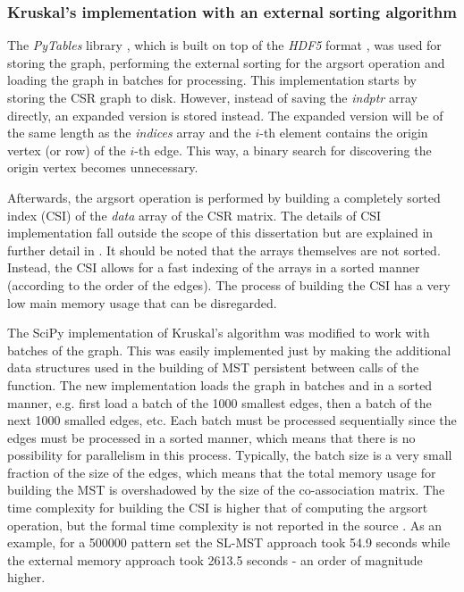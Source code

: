 \subsubsection{Kruskal's implementation with an external sorting algorithm}

The \emph{PyTables} library \cite{pytables}, which is built on top of the \emph{HDF5} format \cite{hdf5}, was used for storing the graph, performing the external sorting for the argsort operation and loading the graph in batches for processing.
This implementation starts by storing the CSR graph to disk.
However, instead of saving the \emph{indptr} array directly, an expanded version is stored instead.
The expanded version will be of the same length as the \emph{indices} array and the $i$-th element contains the origin vertex (or row) of the $i$-th edge.
This way, a binary search for discovering the origin vertex becomes unnecessary.

Afterwards, the argsort operation is performed by building a completely sorted index (CSI) of the \emph{data} array of the CSR matrix.
The details of CSI implementation fall outside the scope of this dissertation but are explained in further detail in \cite{AltetiAbad2007}.
It should be noted that the arrays themselves are not sorted.
Instead, the CSI allows for a fast indexing of the arrays in a sorted manner (according to the order of the edges).
The process of building the CSI has a very low main memory usage that can be disregarded.

The SciPy implementation of Kruskal's algorithm was modified to work with batches of the graph.
This was easily implemented just by making the additional data structures used in the building of MST persistent between calls of the function.
The new implementation loads the graph in batches and in a sorted manner, e.g. first load a batch of the 1000 smallest edges, then a batch of the next 1000 smalled edges, etc.
Each batch must be processed sequentially since the edges must be processed in a sorted manner, which means that there is no possibility for parallelism in this process.
Typically, the batch size is a very small fraction of the size of the edges, which means that the total memory usage for building the MST is overshadowed by the size of the co-association matrix.
The time complexity for building the CSI is higher that of computing the argsort operation, but the formal time complexity is not reported in the source \cite{AltetiAbad2007}.
As an example, for a 500000 pattern set the SL-MST approach took 54.9 seconds while the external memory approach took 2613.5 seconds - an order of magnitude higher.


